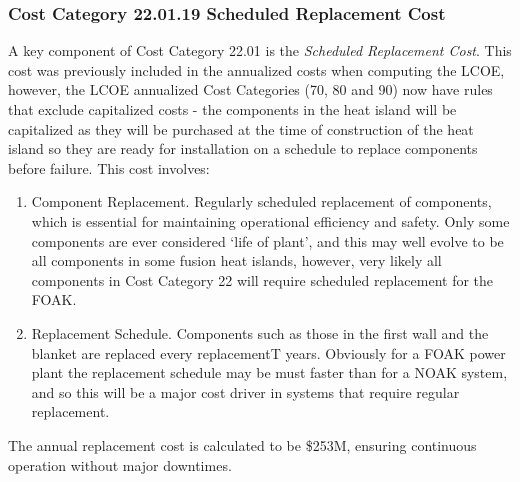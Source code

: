 \subsubsection*{Cost Category 22.01.19 Scheduled Replacement Cost}

A key component of Cost Category 22.01 is the \textit{Scheduled Replacement Cost}.  This cost was previously included in the annualized costs when computing the LCOE, however, the LCOE annualized Cost Categories (70, 80 and 90) now have rules that exclude capitalized costs - the components in the heat island will be capitalized as they will be purchased at the time of construction of the heat island so they are ready for installation on a schedule to replace components before failure.  This cost involves:

\begin{enumerate}
    \item Component Replacement. Regularly scheduled replacement of components, which is essential for maintaining operational efficiency and safety.  Only some components are ever considered `life of plant', and this may well evolve to be all components in some fusion heat islands, however, very likely all components in Cost Category 22 will require scheduled replacement for the FOAK.
    \item Replacement Schedule. Components such as those in the first wall and the blanket are replaced every replacementT years.  Obviously for a FOAK power plant the replacement schedule may be must faster than for a NOAK system, and so this will be a major cost driver in systems that require regular replacement.
\end{enumerate}

The annual replacement cost is calculated to be \$253M, ensuring continuous operation without major downtimes.